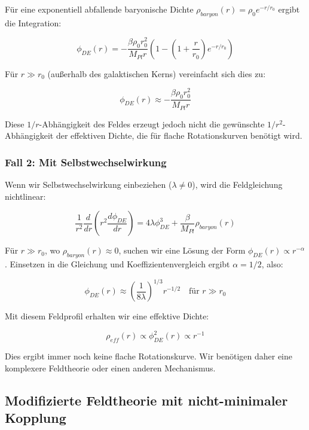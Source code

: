 \documentclass[a4paper,12pt]{article}
\begin{document}
Für eine exponentiell abfallende baryonische Dichte $\rho_{baryon}(r) = \rho_0 e^{-r/r_0}$ ergibt die Integration:

\begin{equation}
	\phi_{DE}(r) = -\frac{\beta\rho_0 r_0^2}{M_{Pl}r}(1 - (1 + \frac{r}{r_0})e^{-r/r_0})
\end{equation}

Für $r \gg r_0$ (außerhalb des galaktischen Kerns) vereinfacht sich dies zu:

\begin{equation}
	\phi_{DE}(r) \approx -\frac{\beta\rho_0 r_0^2}{M_{Pl}r}
\end{equation}

Diese $1/r$-Abhängigkeit des Feldes erzeugt jedoch nicht die gewünschte $1/r^2$-Abhängigkeit der effektiven Dichte, die für flache Rotationskurven benötigt wird.

\subsubsection{Fall 2: Mit Selbstwechselwirkung}

Wenn wir Selbstwechselwirkung einbeziehen ($\lambda \neq 0$), wird die Feldgleichung nichtlinear:

\begin{equation}
	\frac{1}{r^2}\frac{d}{dr}\left(r^2\frac{d\phi_{DE}}{dr}\right) = 4\lambda\phi_{DE}^3 + \frac{\beta}{M_{Pl}}\rho_{baryon}(r)
\end{equation}

Für $r \gg r_0$, wo $\rho_{baryon}(r) \approx 0$, suchen wir eine Lösung der Form $\phi_{DE}(r) \propto r^{-\alpha}$. Einsetzen in die Gleichung und Koeffizientenvergleich ergibt $\alpha = 1/2$, also:

\begin{equation}
	\phi_{DE}(r) \approx \left(\frac{1}{8\lambda}\right)^{1/3} r^{-1/2} \quad \text{für } r \gg r_0
\end{equation}

Mit diesem Feldprofil erhalten wir eine effektive Dichte:

\begin{equation}
	\rho_{eff}(r) \propto \phi_{DE}^2(r) \propto r^{-1}
\end{equation}

Dies ergibt immer noch keine flache Rotationskurve. Wir benötigen daher eine komplexere Feldtheorie oder einen anderen Mechanismus.
\subsection{Modifizierte Feldtheorie mit nicht-minimaler Kopplung}
\end{document}

